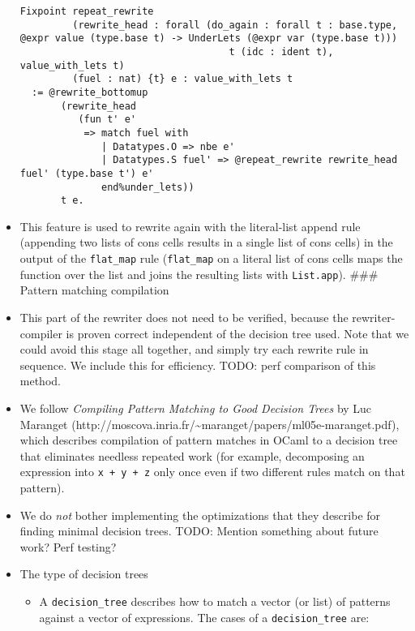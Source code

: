 \documentclass[
]{article}
\begin{document}
\begin{itemize}
\begin{verbatim}
Fixpoint repeat_rewrite
         (rewrite_head : forall (do_again : forall t : base.type, @expr value (type.base t) -> UnderLets (@expr var (type.base t)))
                                    t (idc : ident t), value_with_lets t)
         (fuel : nat) {t} e : value_with_lets t
  := @rewrite_bottomup
       (rewrite_head
          (fun t' e'
           => match fuel with
              | Datatypes.O => nbe e'
              | Datatypes.S fuel' => @repeat_rewrite rewrite_head fuel' (type.base t') e'
              end%under_lets))
       t e.
\end{verbatim}
\item
  This feature is used to rewrite again with the literal-list append
  rule (appending two lists of cons cells results in a single list of
  cons cells) in the output of the \texttt{flat\_map} rule
  (\texttt{flat\_map} on a literal list of cons cells maps the function
  over the list and joins the resulting lists with \texttt{List.app}).
  \#\#\# Pattern matching compilation
\item
  This part of the rewriter does not need to be verified, because the
  rewriter-compiler is proven correct independent of the decision tree
  used. Note that we could avoid this stage all together, and simply try
  each rewrite rule in sequence. We include this for efficiency. TODO:
  perf comparison of this method.
\item
  We follow \emph{Compiling Pattern Matching to Good Decision Trees} by
  Luc Maranget
  (http://moscova.inria.fr/\textasciitilde maranget/papers/ml05e-maranget.pdf),
  which describes compilation of pattern matches in OCaml to a decision
  tree that eliminates needless repeated work (for example, decomposing
  an expression into \texttt{x\ +\ y\ +\ z} only once even if two
  different rules match on that pattern).
\item
  We do \emph{not} bother implementing the optimizations that they
  describe for finding minimal decision trees. TODO: Mention something
  about future work? Perf testing?
\item
  The type of decision trees

  \begin{itemize}
  \item
    A \texttt{decision\_tree} describes how to match a vector (or list)
    of patterns against a vector of expressions. The cases of a
    \texttt{decision\_tree} are:


\end{itemize}
\end{itemize}
\end{document}
